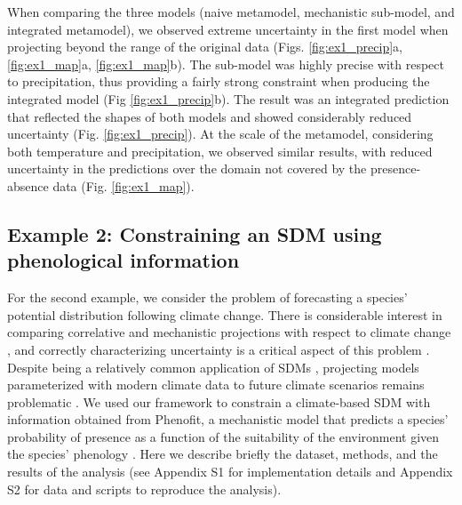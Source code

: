 \documentclass[11pt]{article}
\newcommand{\rev}[1]{{\color{RoyalBlue}#1}}
\begin{document}
When comparing the three models (naive metamodel, mechanistic sub-model, and integrated metamodel), we observed extreme uncertainty in the first model when projecting beyond the range of the original data (Figs. \ref{fig:ex1_precip}a, \ref{fig:ex1_map}a, \ref{fig:ex1_map}b).
The sub-model was highly precise with respect to precipitation, thus providing a fairly strong constraint when producing the integrated model (Fig \ref{fig:ex1_precip}b).
The result was an integrated prediction that reflected the shapes of both models and showed considerably reduced uncertainty (Fig. \ref{fig:ex1_precip}).
At the scale of the metamodel, considering both temperature and precipitation, we observed similar results, with reduced uncertainty in the predictions over the domain not covered by the presence-absence data (Fig. \ref{fig:ex1_map}).


%
%


\subsection*{Example 2: Constraining an SDM using phenological information}
For the second example, we consider the problem of forecasting a species' potential distribution following climate change.
There is considerable interest in comparing correlative and mechanistic projections with respect to climate change \citep{Morin2009}, and correctly characterizing uncertainty is a critical aspect of this problem \citep{Cheaib2012}.
Despite being a relatively common application of SDMs \citep{Guisan2005}, projecting models parameterized with modern climate data to future climate scenarios remains problematic \citep{Araujo2006}.
We used our framework to constrain a climate-based SDM with information obtained from Phenofit, a mechanistic model that predicts a species' probability of presence as a function of the suitability of the environment given the species' phenology \citep{Chuine2001, Morin2009}.
Here we describe briefly the dataset, methods, and the results of the analysis (see \rev{ Appendix S1 for implementation details and Appendix S2} for data and scripts to reproduce the analysis).
\end{document}
